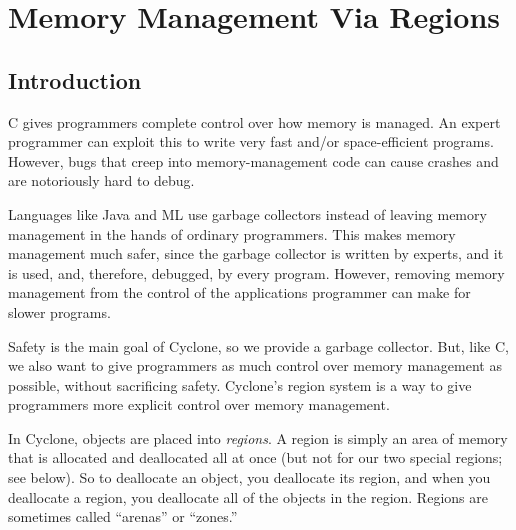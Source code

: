 \section{Memory Management Via Regions}
\label{sec:regions}


\subsection{Introduction}

C gives programmers complete control over how memory is managed.  An expert
programmer can exploit this to write very fast and/or space-efficient
programs.  However, bugs that creep into memory-management code can cause
crashes and are notoriously hard to debug.

Languages like Java and ML use garbage collectors instead of leaving
memory management in the hands of ordinary programmers.  This makes
memory management much safer, since the garbage collector is written
by experts, and it is used, and, therefore, debugged, by every
program.  However, removing memory management from the control of the
applications programmer can make for slower programs.

Safety is the main goal of Cyclone, so we provide a garbage collector.
But, like C, we also want to give programmers as much control over
memory management as possible, without sacrificing safety.  Cyclone's
region system is a way to give programmers more explicit control over
memory management.

In Cyclone, objects are placed into \emph{regions}.  A region is simply an
area of memory that is allocated and deallocated all at once (but not for
our two special regions; see below).  So to deallocate an object, you
deallocate its region, and when you deallocate a region, you deallocate all
of the objects in the region.  Regions are sometimes called ``arenas'' or
``zones.''

